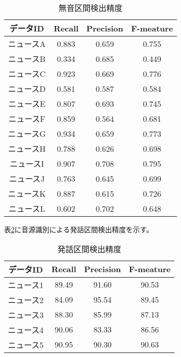 \begin{table}[H]
  \begin{center}
    \caption{無音区間検出精度 \label{table:NHK_pause_RPF}}
    \begin{tabular}{|c||c|c|c|} \hline
データID & Recall & Precision & F-meature \\ \hline
ニュースA & 0.883 & 0.659 & 0.755 \\ \hline
ニュースB & 0.334 & 0.685 & 0.449 \\ \hline
ニュースC & 0.923 & 0.669 & 0.776 \\ \hline
ニュースD & 0.581 & 0.587 & 0.584 \\ \hline
ニュースE & 0.807 & 0.693 & 0.745 \\ \hline
ニュースF & 0.859 & 0.564 & 0.681 \\ \hline
ニュースG & 0.934 & 0.659 & 0.773 \\ \hline
ニュースH & 0.788 & 0.626 & 0.698 \\ \hline
ニュースI & 0.907 & 0.708 & 0.795 \\ \hline
ニュースJ & 0.763 & 0.645 & 0.699 \\ \hline
ニュースK & 0.887 & 0.615 & 0.726 \\ \hline
ニュースL & 0.602 & 0.702 & 0.648 \\ \hline
    \end{tabular}
  \end{center}
\end{table}


表\ref{table:test_detail_RPF}に音源識別による発話区間検出精度を示す。

\begin{table}[H]
  \begin{center}
    \caption{発話区間検出精度 \label{table:test_detail_RPF}}
    \begin{tabular}{|c||c|c|c|} \hline
      データID & Recall & Precision & F-meature \\ \hline
      ニュース1 & 89.49 & 91.60 & 90.53 \\ \hline
      ニュース2 & 84.09 & 95.54 & 89.45\\ \hline
      ニュース3 & 88.30 & 85.99 & 87.13 \\ \hline
      ニュース4 & 90.06 & 83.33 & 86.56\\ \hline
      ニュース5 & 90.95 & 90.30 & 90.63\\ \hline
    \end{tabular}
  \end{center}
\end{table}

